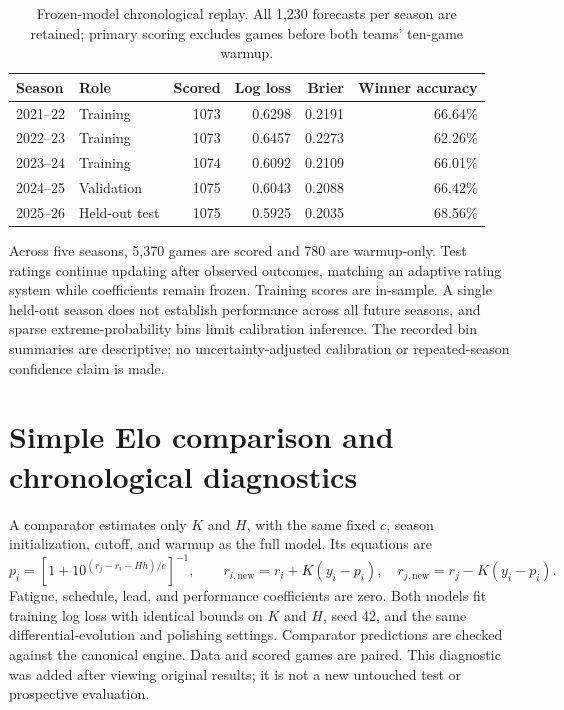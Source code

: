 \documentclass[11pt]{article}
\begin{document}
\begin{table}[ht]
\centering\small
\begin{tabular}{llrrrr}
\toprule
Season & Role & Scored & Log loss & Brier & Winner accuracy\\
\midrule
2021--22 & Training & 1073 & 0.6298 & 0.2191 & 66.64\%\\
2022--23 & Training & 1073 & 0.6457 & 0.2273 & 62.26\%\\
2023--24 & Training & 1074 & 0.6092 & 0.2109 & 66.01\%\\
2024--25 & Validation & 1075 & 0.6043 & 0.2088 & 66.42\%\\
2025--26 & Held-out test & 1075 & 0.5925 & 0.2035 & 68.56\%\\
\bottomrule
\end{tabular}
\caption{Frozen-model chronological replay. All 1,230 forecasts per season are
retained; primary scoring excludes games before both teams' ten-game warmup.}
\end{table}

Across five seasons, 5,370 games are scored and 780 are warmup-only. Test
ratings continue updating after observed outcomes, matching an adaptive rating
system while coefficients remain frozen. Training scores are in-sample.
A single held-out season does not establish performance across all future
seasons, and sparse extreme-probability bins limit calibration inference.
The recorded bin summaries are descriptive; no uncertainty-adjusted calibration
or repeated-season confidence claim is made.

\section{Simple Elo comparison and chronological diagnostics}
A comparator estimates only $K$ and $H$, with the same fixed $c$, season
initialization, cutoff, and warmup as the full model. Its equations are
\begin{equation}
 p_i=[1+10^{(r_j-r_i-Hh)/c}]^{-1},\qquad
 r_{i,\mathrm{new}}=r_i+K(y_i-p_i),\quad r_{j,\mathrm{new}}=r_j-K(y_i-p_i).
\end{equation}
Fatigue, schedule, lead, and performance coefficients are zero. Both models
fit training log loss with identical bounds on $K$ and $H$, seed 42, and the
same differential-evolution and polishing settings. Comparator predictions
are checked against the canonical engine. Data and scored games are paired.
This diagnostic was added after viewing original results; it is not a new
untouched test or prospective evaluation.
\end{document}
